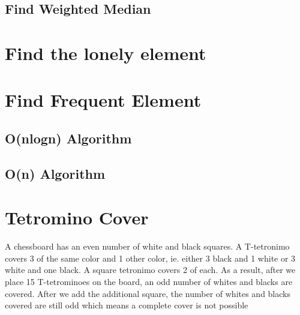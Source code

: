 \documentclass{article}
\begin{document}
        

    \subsection{Find Weighted Median}
    \label{sub:Find Weighted Median}

        

\section{Find the lonely element}
\label{sec:Find the lonely element}

    

\section{Find Frequent Element}
\label{sec:Find Frequent Element}

    \subsection{O(nlogn) Algorithm}
    \label{sub:nlogn Algorithm}

        

    \subsection{O(n) Algorithm}
    \label{sub:nlogn Algorithm}

        

\section{Tetromino Cover}
\label{sec:Tetromino Cover}

    A chessboard has an even number of white and black squares. A T-tetronimo covers 3 of the same color and 1 other color, ie. either 3 black and 1 white or 3 white and one black. A square tetronimo covers 2 of each.
    As a result, after we place 15 T-tetrominoes on the board, an odd number of whites and blacks are covered. After we add the additional square, the number of whites and blacks covered are still odd which means a complete cover is not possible
\end{document}
